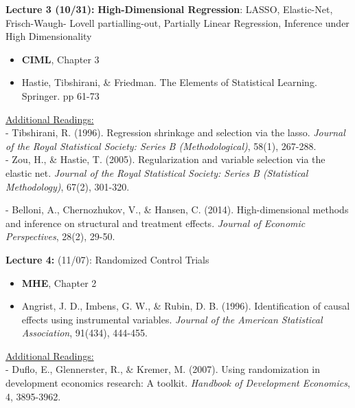 \documentclass[12pt]{article}
\begin{document}
\vspace{2em}
\noindent\textbf{Lecture 3 (10/31): } \textbf{High-Dimensional
Regression}: LASSO, Elastic-Net, Frisch-Waugh-
Lovell partialling-out, Partially Linear Regression, Inference under High Dimensionality  \\
\vspace{1em}
\begin{itemize}
    \item \textbf{CIML}, Chapter 3
    \item Hastie, Tibshirani, \& Friedman. The Elements of Statistical Learning. Springer. pp 61-73
\end{itemize}
\vspace{1em}
\underline{Additional Readings:} \\
\hspace{1em} - Tibshirani, R. (1996). Regression shrinkage and selection via the lasso. \textit{Journal of the Royal Statistical Society: Series B (Methodological)}, 58(1), 267-288. \\
\hspace{1em} - Zou, H., \& Hastie, T. (2005). Regularization and variable selection via the elastic net. \textit{Journal of the Royal Statistical Society: Series B (Statistical Methodology)}, 67(2), 301-320.

\hspace{1em} - Belloni, A., Chernozhukov, V., \& Hansen, C. (2014). High-dimensional methods and inference on structural and treatment effects. \textit{Journal of Economic Perspectives}, 28(2), 29-50.

\vspace{2em}
\noindent\textbf{Lecture 4:} (11/07): Randomized Control Trials \\
\vspace{1em}
\begin{itemize}
    \item \textbf{MHE}, Chapter 2
    \item Angrist, J. D., Imbens, G. W., \& Rubin, D. B. (1996). Identification of causal effects using instrumental variables. \textit{Journal of the American Statistical Association}, 91(434), 444-455.
\end{itemize}
\vspace{1em}
\underline{Additional Readings:} \\
\hspace{1em} - Duflo, E., Glennerster, R., \& Kremer, M. (2007). Using randomization in development economics research: A toolkit. \textit{Handbook of Development Economics}, 4, 3895-3962.
\end{document}
